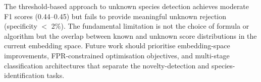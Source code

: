 \documentclass[11pt,a4paper]{article}
\begin{document}
\begin{tcolorbox}[colback=blue!5, colframe=blue!60, title={\textbf{Conclusion}}, fonttitle=\bfseries]
The threshold-based approach to unknown species detection achieves moderate F1 scores (0.44--0.45) but fails to provide meaningful unknown rejection (specificity $<$ 2\%). The fundamental limitation is not the choice of formula or algorithm but the overlap between known and unknown score distributions in the current embedding space. Future work should prioritise embedding-space improvements, FPR-constrained optimisation objectives, and multi-stage classification architectures that separate the novelty-detection and species-identification tasks.
\end{tcolorbox}
\end{document}
